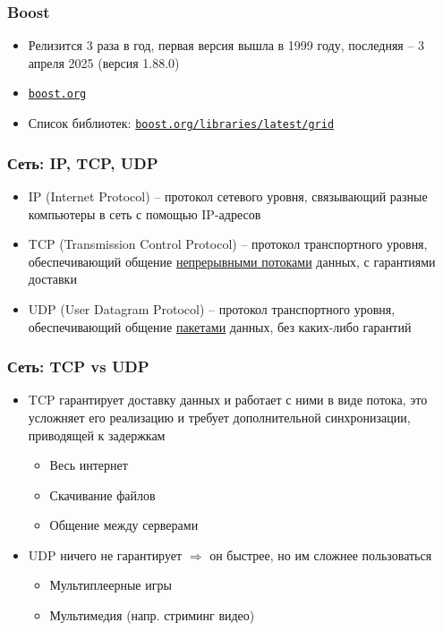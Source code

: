 \documentclass[10pt]{beamer}
\begin{document}
\begin{frame}[fragile]
\frametitle{Boost}
\begin{itemize}
\item Релизится 3 раза в год, первая версия вышла в 1999 году, последняя -- 3 апреля 2025 (версия 1.88.0)
\pause
\item \href{https://www.boost.org}{\nolinkurl{boost.org}}
\pause
\item Список библиотек: \href{https://www.boost.org/libraries/latest/grid}{\nolinkurl{boost.org/libraries/latest/grid}}
\end{itemize}
\end{frame}

\begin{frame}[fragile]
\frametitle{Сеть: IP, TCP, UDP}
\begin{itemize}
\item IP (Internet Protocol) -- протокол сетевого уровня, связывающий разные компьютеры в сеть с помощью IP-адресов
\pause
\item TCP (Transmission Control Protocol) -- протокол транспортного уровня, обеспечивающий общение \underline{непрерывными потоками} данных, с гарантиями доставки
\pause
\item UDP (User Datagram Protocol) -- протокол транспортного уровня, обеспечивающий общение \underline{пакетами} данных, без каких-либо гарантий
\end{itemize}
\end{frame}

\begin{frame}[fragile]
\frametitle{Сеть: TCP vs UDP}
\begin{itemize}
\item TCP гарантирует доставку данных и работает с ними в виде потока, это усложняет его реализацию и требует дополнительной синхронизации, приводящей к задержкам
\pause
\begin{itemize}
\item Весь интернет
\item Скачивание файлов
\item Общение между серверами
\end{itemize}
\pause
\item UDP ничего не гарантирует \begin{math}\Longrightarrow\end{math} он быстрее, но им сложнее пользоваться
\begin{itemize}
\item Мультиплеерные игры
\item Мультимедия (напр. стриминг видео)
\end{itemize}
\end{itemize}
\end{frame}
\end{document}
